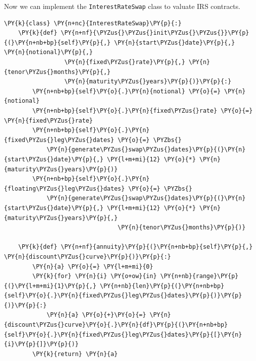 Now we can implement the \texttt{InterestRateSwap} class to valuate IRS
contracts.

\begin{tcolorbox}[breakable, size=fbox, boxrule=1pt, pad at break*=1mm,colback=cellbackground, colframe=cellborder]
\begin{Verbatim}[commandchars=\\\{\}]
\PY{k}{class} \PY{n+nc}{InterestRateSwap}\PY{p}{:}    
    \PY{k}{def} \PY{n+nf}{\PYZus{}\PYZus{}init\PYZus{}\PYZus{}}\PY{p}{(}\PY{n+nb+bp}{self}\PY{p}{,} \PY{n}{start\PYZus{}date}\PY{p}{,} \PY{n}{notional}\PY{p}{,} 
                 \PY{n}{fixed\PYZus{}rate}\PY{p}{,} \PY{n}{tenor\PYZus{}months}\PY{p}{,} 
                 \PY{n}{maturity\PYZus{}years}\PY{p}{)}\PY{p}{:}
        \PY{n+nb+bp}{self}\PY{o}{.}\PY{n}{notional} \PY{o}{=} \PY{n}{notional}
        \PY{n+nb+bp}{self}\PY{o}{.}\PY{n}{fixed\PYZus{}rate} \PY{o}{=} \PY{n}{fixed\PYZus{}rate}
        \PY{n+nb+bp}{self}\PY{o}{.}\PY{n}{fixed\PYZus{}leg\PYZus{}dates} \PY{o}{=} \PYZbs{}
            \PY{n}{generate\PYZus{}swap\PYZus{}dates}\PY{p}{(}\PY{n}{start\PYZus{}date}\PY{p}{,} \PY{l+m+mi}{12} \PY{o}{*} \PY{n}{maturity\PYZus{}years}\PY{p}{)}
        \PY{n+nb+bp}{self}\PY{o}{.}\PY{n}{floating\PYZus{}leg\PYZus{}dates} \PY{o}{=} \PYZbs{}
            \PY{n}{generate\PYZus{}swap\PYZus{}dates}\PY{p}{(}\PY{n}{start\PYZus{}date}\PY{p}{,} \PY{l+m+mi}{12} \PY{o}{*} \PY{n}{maturity\PYZus{}years}\PY{p}{,}
                                \PY{n}{tenor\PYZus{}months}\PY{p}{)}
        
    \PY{k}{def} \PY{n+nf}{annuity}\PY{p}{(}\PY{n+nb+bp}{self}\PY{p}{,} \PY{n}{discount\PYZus{}curve}\PY{p}{)}\PY{p}{:}
        \PY{n}{a} \PY{o}{=} \PY{l+m+mi}{0}
        \PY{k}{for} \PY{n}{i} \PY{o+ow}{in} \PY{n+nb}{range}\PY{p}{(}\PY{l+m+mi}{1}\PY{p}{,} \PY{n+nb}{len}\PY{p}{(}\PY{n+nb+bp}{self}\PY{o}{.}\PY{n}{fixed\PYZus{}leg\PYZus{}dates}\PY{p}{)}\PY{p}{)}\PY{p}{:}
            \PY{n}{a} \PY{o}{+}\PY{o}{=} \PY{n}{discount\PYZus{}curve}\PY{o}{.}\PY{n}{df}\PY{p}{(}\PY{n+nb+bp}{self}\PY{o}{.}\PY{n}{fixed\PYZus{}leg\PYZus{}dates}\PY{p}{[}\PY{n}{i}\PY{p}{]}\PY{p}{)}
        \PY{k}{return} \PY{n}{a}


\end{Verbatim}
\end{tcolorbox}
